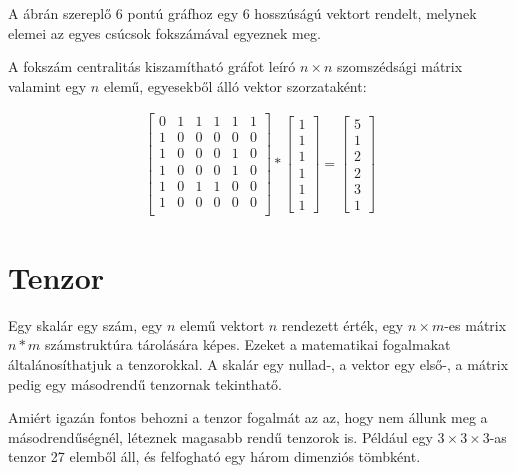 \documentclass[12pt,numbers=noenddot]{report}
\begin{document}
\vspace{0.5cm}

A ábrán szereplő 6 pontú gráfhoz egy 6 hosszúságú vektort rendelt, 
melynek elemei az egyes csúcsok fokszámával egyeznek meg.

A fokszám centralitás kiszamítható gráfot leíró $n \times n$ szomszédsági 
mátrix valamint egy $n$ elemű, egyesekből álló vektor szorzataként:

\begin{align}
	\begin{bmatrix}
		0 & 1 & 1 & 1 & 1 & 1 \\
		1 & 0 & 0 & 0 & 0 & 0 \\
		1 & 0 & 0 & 0 & 1 & 0 \\
		1 & 0 & 0 & 0 & 1 & 0 \\
		1 & 0 & 1 & 1 & 0 & 0 \\
		1 & 0 & 0 & 0 & 0 & 0 \\
	\end{bmatrix}
	*
	\begin{bmatrix}
		1\\
		1\\
		1\\
		1\\
		1\\
		1
	\end{bmatrix}
	=
	\begin{bmatrix}
		5\\
		1\\
		2\\
		2\\
		3\\
		1
	\end{bmatrix}
\end{align}


\section{Tenzor}

Egy skalár egy szám, egy $n$ elemű vektort $n$ rendezett érték, egy 
$n \times m$-es mátrix $n*m$ számstruktúra tárolására képes. 
Ezeket a matematikai fogalmakat általánosíthatjuk a tenzorokkal. 
A skalár egy nullad-, a vektor egy első-, a mátrix pedig egy másodrendű tenzornak 
tekinthatő.

Amiért igazán fontos behozni a tenzor fogalmát az az, hogy nem állunk meg a 
másodrendűségnél, léteznek magasabb rendű tenzorok is. Például egy 
$3 \times 3 \times 3$-as tenzor 27 elemből áll, és felfogható egy három 
dimenziós tömbként.
\end{document}
